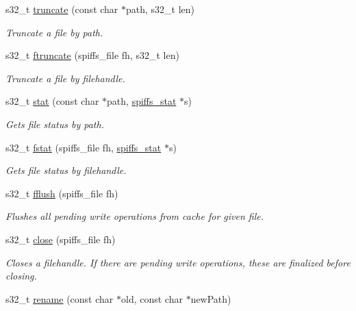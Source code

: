 \begin{DoxyCompactItemize}
s32\+\_\+t \mbox{\hyperlink{class_spiffs_particle_af52be85536c06520864bd4918b3fe927}{truncate}} (const char $\ast$path, s32\+\_\+t len)
\begin{DoxyCompactList}\small\item\em Truncate a file by path. \end{DoxyCompactList}\item 
s32\+\_\+t \mbox{\hyperlink{class_spiffs_particle_a9bcb248af1aa3fe66b6a853304765e35}{ftruncate}} (spiffs\+\_\+file fh, s32\+\_\+t len)
\begin{DoxyCompactList}\small\item\em Truncate a file by filehandle. \end{DoxyCompactList}\item 
s32\+\_\+t \mbox{\hyperlink{class_spiffs_particle_a42bc28baf22af229ca371a0a1e2d16a6}{stat}} (const char $\ast$path, \mbox{\hyperlink{structspiffs__stat}{spiffs\+\_\+stat}} $\ast$s)
\begin{DoxyCompactList}\small\item\em Gets file status by path. \end{DoxyCompactList}\item 
s32\+\_\+t \mbox{\hyperlink{class_spiffs_particle_a2ea24c9aded8801cafd373b11dd912d7}{fstat}} (spiffs\+\_\+file fh, \mbox{\hyperlink{structspiffs__stat}{spiffs\+\_\+stat}} $\ast$s)
\begin{DoxyCompactList}\small\item\em Gets file status by filehandle. \end{DoxyCompactList}\item 
s32\+\_\+t \mbox{\hyperlink{class_spiffs_particle_a32b335384933ca63e6f8026759ced629}{fflush}} (spiffs\+\_\+file fh)
\begin{DoxyCompactList}\small\item\em Flushes all pending write operations from cache for given file. \end{DoxyCompactList}\item 
s32\+\_\+t \mbox{\hyperlink{class_spiffs_particle_af9962503f18487131191a5647e32ef2a}{close}} (spiffs\+\_\+file fh)
\begin{DoxyCompactList}\small\item\em Closes a filehandle. If there are pending write operations, these are finalized before closing. \end{DoxyCompactList}\item 
s32\+\_\+t \mbox{\hyperlink{class_spiffs_particle_ad016729fc6bc5560ddb5e5faba089b4f}{rename}} (const char $\ast$old, const char $\ast$new\+Path)

\end{DoxyCompactItemize}
